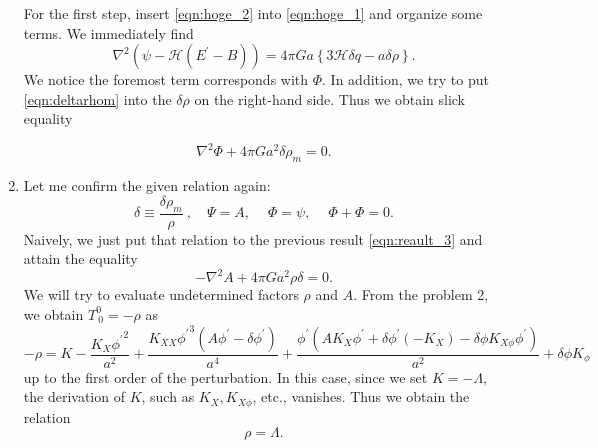 \documentclass[a4paper,pdftex,10pt]{article}
\begin{document}
\begin{enumerate}
        For the first step, insert \eqref{eqn:hoge_2} into \eqref{eqn:hoge_1} and organize some terms. We immediately find
        \begin{equation}
          \nabla^2(\psi-\mathcal{H}(E^{\prime}-B))
          =
          4\pi Ga
          \left\{
          3\mathcal{H}\delta q
          -
          a\delta\rho
          \right\}
          .
        \end{equation}
        We notice the foremost term corresponds with $\Phi$. In addition, we try to put \eqref{eqn:deltarhom} into the $\delta\rho$ on the right-hand side. Thus we obtain slick equality
        \begin{graybox}
          \vspace*{-5pt}
          \begin{equation}
            \nabla^2\Phi
            +
            4\pi Ga^2\delta\rho_{m}
            =
            0
            .
            \label{eqn:reault_3}
          \end{equation}
        \end{graybox}

  \item        
        Let me confirm the given relation again:
        \begin{equation}
          \delta
          \equiv
          \frac{\delta\rho_{m}}{\rho}
          \ ,\quad
          \Psi=A
          ,\ \quad
          \Phi=\psi
          ,\ \quad
          \Phi+\Phi=0
          .
        \end{equation}
        Naively, we just put that relation to the previous result \eqref{eqn:reault_3} and attain the equality
        \begin{equation}
          -\nabla^2 A+4\pi Ga^2 \rho\delta=0
          .
          \label{eqn:hoge_3}
        \end{equation}
        We will try to evaluate undetermined factors $\rho$ and $A$. From the problem 2, we obtain $T^{0}_{\ 0}=-\rho$ as 
        \begin{equation}
          -\rho
          =
          K-\frac{K_X {\phi^{\prime}}^2}{a^2}+\frac{K_{XX} {\phi^{\prime}}^3 (A {\phi^{\prime}}-{\delta \phi^{\prime}})}{a^4}+\frac{{\phi^{\prime}} (A K_X {\phi^{\prime}}+{\delta \phi^{\prime}} (-K_X)-\delta \phi  K_{X\phi} {\phi^{\prime}})}{a^2}+\delta \phi  K_{\phi }
        \end{equation} 
        up to the first order of the perturbation. In this case, since we set $K=-\Lambda$, the derivation of $K$, such as $K_{X}, K_{X\phi}$, etc., vanishes. Thus we obtain the relation
        \begin{equation}
          \rho=\Lambda
          .
          \label{eqn:rhoequalLambda}
        \end{equation}
        

\end{enumerate}
\end{document}
